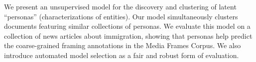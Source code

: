 We present an unsupervised model for the discovery and clustering of latent ``personas'' (characterizations of entities). Our model simultaneously clusters documents featuring similar collections of personas. We evaluate this model on a collection of news articles about immigration, showing that personas help predict the coarse-grained framing annotations in the Media Frames Corpus. We also introduce automated model selection as a fair and robust form of evaluation.
